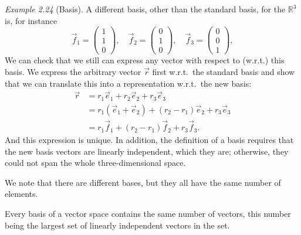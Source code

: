 \documentclass[
  letterpaper,
  DIV=11,
  numbers=noendperiod]{scrartcl}
\theoremstyle{remark}
\newenvironment{fbxSimple}[3]{\begin{tcolorbox}[enhanced, breakable,%
attach boxed title to top*={xshift=1.4pt},
boxed title style={boxrule=0.0mm, fuzzy shadow={1pt}{-1pt}{0mm}{0.1mm}{gray}, arc=.3em, rounded corners=east, sharp corners=west}, colframe=#1-color2, colbacktitle=#1-color1, colback = white, coltitle=black,  titlerule=0mm, toprule=0pt, bottomrule=.7pt, leftrule=.3em, rightrule=.7pt, outer arc=.3em,  	left=.5em, right=.5em, bottomtitle=1mm, toptitle=1mm,title=\textbf{#2}\hspace{0.5em}{#3}]}
{\end{tcolorbox}}
\begin{document}
\emph{Example 2.24} (Basis). A different basis, other than the standard
basis, for the \(\mathbb{R}^{3}\) is, for instance
\[\vec{f}_{1} =  \scriptscriptstyle \begin{pmatrix}   1\\ 1 \\ 0   \end{pmatrix} \textstyle, \quad \vec{f}_{2} =  \scriptscriptstyle \begin{pmatrix}   0\\ 1 \\ 0   \end{pmatrix} \textstyle, \quad \vec{f}_{3} =  \scriptscriptstyle \begin{pmatrix}   0\\ 0 \\ 1  \end{pmatrix} \textstyle,\]
We can check that we still can express any vector with respect to
(w.r.t.) this basis. We express the arbitrary vector \(\vec{r}\) first
w.r.t.~the standard basis and show that we can translate this into a
representation w.r.t.~the new basis: \[\begin{aligned}
 \vec{r} & = r_{1} \vec{e}_{1} + r_{2} \vec{e}_{2} +r_{3} \vec{e}_{3}  \\
  & = r_{1} (\vec{e}_{1} + \vec{e}_{2})  + (r_{2}-r_{1}) \vec{e}_{2} +r_{3} \vec{e}_{3}  \\
  & = r_{1} \vec{f}_{1} + (r_{2}-r_{1}) \vec{f}_{2} +r_{3} \vec{f}_{3}  .
\end{aligned}\] And this expression is unique. In addition, the
definition of a basis requires that the new basis vectors are linearly
independent, which they are; otherwise, they could not span the whole
three-dimensional space.

We note that there are different bases, but they all have the same
number of elements.

\label{number-of-elements-of-a-basis}
\begin{fbxSimple}{Theorem}{Theorem 8: }{Number of elements of a basis}
\label{number-of-elements-of-a-basis}
Every basis of a vector space contains the same number of vectors, this
number being the largest set of linearly independent vectors in the set.

\end{fbxSimple}
\end{document}
